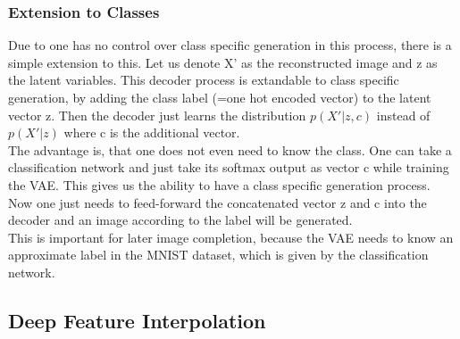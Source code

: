 \documentclass[
     11pt,         %
     a4paper,      %
     oneside,
     ]{article}
\begin{document}
\subsubsection{Extension to Classes}
Due to one has no control over class specific generation in this process, there is a simple extension to this. Let us denote X' as the reconstructed image and z as the latent variables. This decoder process is extandable to class specific generation, by adding the class label (=one hot encoded vector) to the latent vector z. Then the decoder just learns the distribution $p(X'|z,c)$ instead of  $p(X'|z)$ where c is the additional vector.\\
The advantage is, that one does not even need to know the class. One can take a classification network and just take its softmax output as vector c while training the VAE. This gives us the ability to have a class specific generation process. Now one just needs to feed-forward the concatenated vector z and c into the decoder and an image according to the label will be generated.\\
This is important for later image completion, because the VAE needs to know an approximate label in the MNIST dataset, which is given by the classification network.

\subsection{Deep Feature Interpolation}
\end{document}
